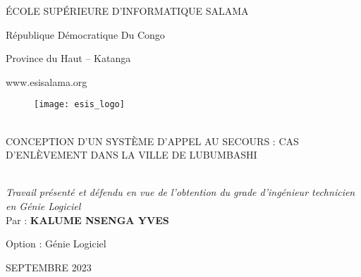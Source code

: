 \begin{titlepage}
	\begin{center}
		\large
		ÉCOLE SUPÉRIEURE D’INFORMATIQUE SALAMA
		
		\vspace{1.25pt}
		République Démocratique Du Congo
		
		Province du Haut – Katanga
		
		www.esisalama.org
		
		\vspace{0.5cm}
		
		\begin{figure}[h]
			\texttt{[image: esis\_logo]}
			\centering
		\end{figure}
		
		\vspace{0.5cm}
		\hrulefill\\[0.5cm]
		CONCEPTION D'UN SYSTÈME D’APPEL AU SECOURS : CAS D'ENLÈVEMENT DANS LA VILLE DE LUBUMBASHI\\
		\hrulefill\\[1cm]
		
		\vspace{0.5cm}		
		\hfill
		\begin{minipage}{0.5\textwidth}
			
			\textit{Travail présenté et défendu en vue de l’obtention du grade d’ingénieur technicien en Génie Logiciel}\\
			
			Par : \textbf{KALUME NSENGA YVES}
			
			Option : Génie Logiciel
		\end{minipage}
		
		\vfill
		SEPTEMBRE 2023
	\end{center}
\end{titlepage}

